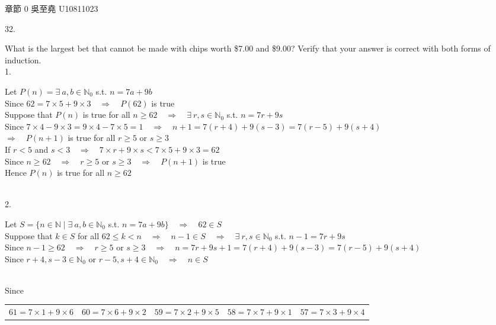 \documentclass[12pt]{book}
\author{andersonwu2000}
\begin{document}
\begin{CJK}{UTF8}{bsmi}

\hfill 章節 0 吳至堯 U10811023


32. \begin{minipage}[t]{\dimexpr\linewidth-2em}
What is the largest bet that cannot be made with chips worth \$7.00 and \$9.00? Verify that your answer is correct with both forms of induction. \\
1. \begin{minipage}[t]{\dimexpr\linewidth}
    Let $P(n)=\exists\ a, b\in\mathbb{N}_0$ s.t. $n=7a+9b$ \\
    Since $62=7\times5+9\times3\quad\Rightarrow\quad P(62)$ is true \\
    Suppose that $P(n)$ is true for all $n\ge62\quad\Rightarrow\quad\exists\ r, s\in\mathbb{N}_0$ s.t. $n=7r+9s$ \\
    Since $7\times4-9\times3=9\times4-7\times5=1\quad\Rightarrow\quad n+1=7(r+4)+9(s-3)=7(r-5)+9(s+4)$ \\
    $\Rightarrow\quad P(n+1)$ is true for all $r\ge5$ or $s\ge3$ \\
    If $r<5$ and $s<3\quad\Rightarrow\quad 7\times r+9\times s<7\times5+9\times3=62$ \\
    Since $n\ge62\quad\Rightarrow\quad r\ge5$ or $s\ge3\quad\Rightarrow\quad P(n+1)$ is true \\
    Hence $P(n)$ is true for all $n\ge62$
\end{minipage} \\[5pt]
2. \begin{minipage}[t]{\dimexpr\linewidth}
    Let $S=\{n\in\mathbb{N}\mid\exists\ a, b\in\mathbb{N}_0$ s.t. $n=7a+9b\}\quad\Rightarrow\quad 62\in S$\\
    Suppose that $k\in S$ for all $62\le k< n\quad\Rightarrow\quad n-1\in S\quad\Rightarrow\quad\exists\ r,s\in\mathbb{N}_0$ s.t. $n-1=7r+9s$ \\
    Since $n-1\ge62\quad\Rightarrow\quad r\ge5$ or $s\ge3\quad\Rightarrow\quad n=7r+9s+1=7(r+4)+9(s-3)=7(r-5)+9(s+4)$ \\
    Since $r+4, s-3\in\mathbb{N}_0$ or $r-5, s+4\in\mathbb{N}_0\quad\Rightarrow\quad n\in S$
\end{minipage} \\
Since \\
\begin{tabular}[t]{ccccc}
    $61=7\times1+9\times6$ & $60=7\times6+9\times2$ & $59=7\times2+9\times5$ & $58=7\times7+9\times1$ & $57=7\times3+9\times4$ \\ 

\end{tabular}
\end{minipage}
\end{CJK}
\end{document}
